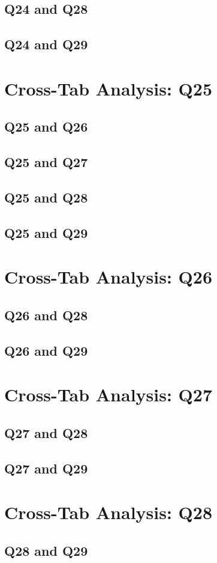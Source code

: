 \documentclass{report}
\begin{document}
\section{Q24 and Q28}\clearpage
\section{Q24 and Q29}\clearpage

\chapter{Cross-Tab Analysis: Q25}

\section{Q25 and Q26}\clearpage
\section{Q25 and Q27}\clearpage
\section{Q25 and Q28}\clearpage
\section{Q25 and Q29}\clearpage

\chapter{Cross-Tab Analysis: Q26}

\section{Q26 and Q28}\clearpage
\section{Q26 and Q29}\clearpage

\chapter{Cross-Tab Analysis: Q27}

\section{Q27 and Q28}\clearpage
\section{Q27 and Q29}\clearpage

\chapter{Cross-Tab Analysis: Q28}

\section{Q28 and Q29}\clearpage





\end{document}
